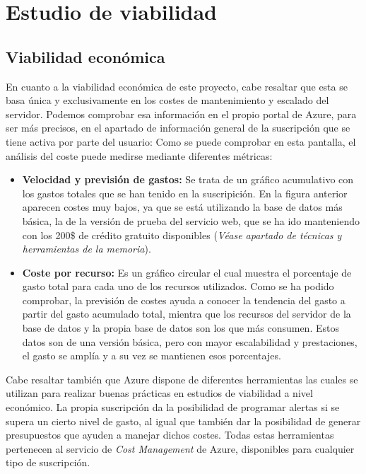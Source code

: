 \section{Estudio de viabilidad}

\subsection{Viabilidad económica}

En cuanto a la viabilidad económica de este proyecto, cabe resaltar que esta se
basa única y exclusivamente en los costes de mantenimiento y escalado del
servidor. Podemos comprobar esa información en el propio portal de Azure, para
ser más precisos, en el apartado de información general de la suscripción que se
tiene activa por parte del usuario:
Como se puede comprobar en esta pantalla, el análisis del coste puede medirse mediante diferentes métricas:
\begin{itemize}
    \item \textbf{Velocidad y previsión de gastos: }Se trata de un gráfico
    acumulativo con los gastos totales que se han tenido en la suscripición. En
    la figura anterior aparecen costes muy bajos, ya que se está utilizando la
    base de datos más básica, la de la versión de prueba del servicio web, que
    se ha ido manteniendo con los 200\$ de crédito gratuito disponibles
    (\textit{Véase apartado de técnicas y herramientas de la memoria}).
    \item \textbf{Coste por recurso: }Es un gráfico circular el cual muestra el
    porcentaje de gasto total para cada uno de los recursos utilizados.
    Como se ha podido comprobar, la previsión de costes ayuda a conocer la
    tendencia del gasto a partir del gasto acumulado total, mientra que los
    recursos del servidor de la base de datos y la propia base de datos son los
    que más consumen. Estos datos son de una versión básica, pero con mayor
    escalabilidad y prestaciones, el gasto se amplía y a su vez se mantienen
    esos porcentajes.
\end{itemize}
Cabe resaltar también que Azure dispone de diferentes herramientas las cuales se
utilizan para realizar buenas prácticas en estudios de viabilidad a nivel
económico. La propia suscripción da la posibilidad de programar alertas si se
supera un cierto nivel de gasto, al igual que también dar la posibilidad de
generar presupuestos que ayuden a manejar dichos costes. Todas estas
herramientas pertenecen al servicio de \textit{Cost Management} de Azure,
disponibles para cualquier tipo de suscripción.
